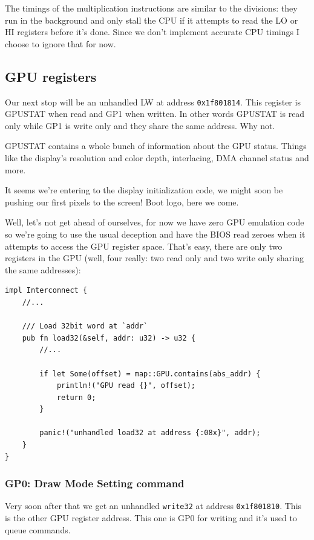 \documentclass[a4paper]{article}
\newcommand{\code}[1] {\texttt{#1}}
\begin{document}
The timings of the multiplication instructions are similar to the
divisions: they run in the background and only stall the CPU if it
attempts to read the LO or HI registers before it's done. Since we
don't implement accurate CPU timings I choose to ignore that for now.

\subsection{GPU registers}

Our next stop will be an unhandled LW at address
\code{0x1f801814}. This register is GPUSTAT when read and GP1 when
written. In other words GPUSTAT is read only while GP1 is write only
and they share the same address. Why not.

GPUSTAT contains a whole bunch of information about the GPU
status. Things like the display's resolution and color depth,
interlacing, DMA channel status and more.

It seems we're entering to the display initialization code, we might
soon be pushing our first pixels to the screen! Boot logo, here we
come.

Well, let's not get ahead of ourselves, for now we have zero GPU
emulation code so we're going to use the usual deception and have the
BIOS read zeroes when it attempts to access the GPU register
space. That's easy, there are only two registers in the GPU (well,
four really: two read only and two write only sharing the same
addresses):

\begin{lstlisting}
impl Interconnect {
    //...

    /// Load 32bit word at `addr`
    pub fn load32(&self, addr: u32) -> u32 {
        //...

        if let Some(offset) = map::GPU.contains(abs_addr) {
            println!("GPU read {}", offset);
            return 0;
        }

        panic!("unhandled load32 at address {:08x}", addr);
    }
}
\end{lstlisting}

\subsubsection{GP0: Draw Mode Setting command}

Very soon after that we get an unhandled \code{write32} at address
\code{0x1f801810}. This is the other GPU register address. This one is
GP0 for writing and it's used to queue commands.
\end{document}
